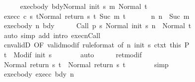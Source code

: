 \begin{isabellebody}
\ \ \ \ \isamarkupfalse%
\ exec{\isacharunderscore}body{\isacharcolon}\ {\isachardoublequoteopen}{\isasymGamma}{\isasymturnstile}{\isasymlangle}bdy{\isacharcomma}Normal\ {\isacharparenleft}init\ s{\isacharparenright}{\isasymrangle}\ {\isacharequal}m{\isasymRightarrow}\ Normal\ t{\isacharprime}{\isachardoublequoteclose}\ \isanewline
\ \ \ \ \isamarkupfalse%
\ exec{\isacharunderscore}c{\isacharcolon}\ {\isachardoublequoteopen}{\isasymGamma}{\isasymturnstile}{\isasymlangle}c\ s\ t{\isacharprime}{\isacharcomma}Normal\ {\isacharparenleft}return\ s\ t{\isacharprime}{\isacharparenright}{\isasymrangle}\ {\isacharequal}Suc\ m{\isasymRightarrow}\ t{\isachardoublequoteclose}\ \isanewline
\ \ \ \ \isamarkupfalse%
\ n{\isacharcolon}\ {\isachardoublequoteopen}n\ {\isacharequal}\ Suc\ m{\isachardoublequoteclose}\isanewline
\ \ \ \ \isamarkupfalse%
\ exec{\isacharunderscore}body\ n\ bdy\isanewline
\ \ \ \ \isamarkupfalse%
\ {\isachardoublequoteopen}{\isasymGamma}{\isasymturnstile}{\isasymlangle}Call\ {\isacharparenleft}p\ s{\isacharparenright}\ {\isacharcomma}Normal\ {\isacharparenleft}init\ s{\isacharparenright}{\isasymrangle}\ {\isacharequal}n\ {\isasymRightarrow}\ Normal\ t{\isacharprime}{\isachardoublequoteclose}\isanewline
\ \ \ \ \ \ \isamarkupfalse%
\ {\isacharparenleft}auto\ simp\ add{\isacharcolon}\ intro{\isacharcolon}\ execn{\isachardot}Call{\isacharparenright}\isanewline
\ \ \ \ \isamarkupfalse%
\ cnvalidD\ {\isacharbrackleft}OF\ valid{\isacharunderscore}modif{\isacharprime}\ {\isacharbrackleft}rule{\isacharunderscore}format{\isacharcomma}\ of\ n\ {\isachardoublequoteopen}init\ s{\isachardoublequoteclose}{\isacharbrackright}\ ctxt\ this{\isacharbrackright}\ P\isanewline
\ \ \ \ \isamarkupfalse%
\ {\isachardoublequoteopen}t{\isacharprime}\ {\isasymin}\ Modif\ {\isacharparenleft}init\ s{\isacharparenright}{\isachardoublequoteclose}\isanewline
\ \ \ \ \ \ \isamarkupfalse%
\ auto\isanewline
\ \ \ \ \isamarkupfalse%
\ ret{\isacharunderscore}modif\ \isamarkupfalse%
\ {\isachardoublequoteopen}Normal\ {\isacharparenleft}return{\isacharprime}\ s\ t{\isacharprime}{\isacharparenright}\ {\isacharequal}\ Normal\ {\isacharparenleft}return\ s\ t{\isacharprime}{\isacharparenright}{\isachardoublequoteclose}\isanewline
\ \ \ \ \ \ \isamarkupfalse%
\ simp\isanewline
\ \ \ \ \isamarkupfalse%
\ exec{\isacharunderscore}body\ exec{\isacharunderscore}c\ bdy\ n\isanewline

\end{isabellebody}
